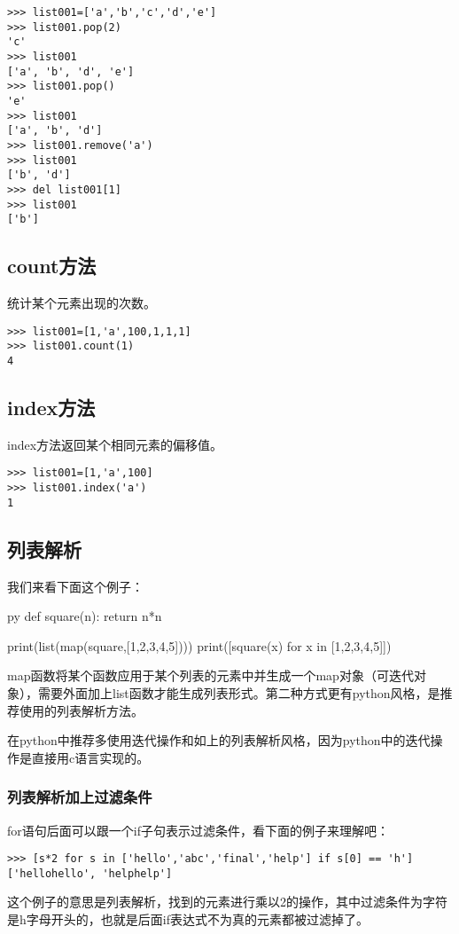 \documentclass[12pt,oneside]{book}
\begin{document}
\begin{common-format}
\begin{Verbatim}
>>> list001=['a','b','c','d','e']
>>> list001.pop(2)
'c'
>>> list001
['a', 'b', 'd', 'e']
>>> list001.pop()
'e'
>>> list001
['a', 'b', 'd']
>>> list001.remove('a')
>>> list001
['b', 'd']
>>> del list001[1]
>>> list001
['b']
\end{Verbatim}


\subsection{count方法}
统计某个元素出现的次数。
\begin{Verbatim}
>>> list001=[1,'a',100,1,1,1]
>>> list001.count(1)
4
\end{Verbatim}


\subsection{index方法}
index方法返回某个相同元素的偏移值。
\begin{Verbatim}
>>> list001=[1,'a',100]
>>> list001.index('a')
1
\end{Verbatim}


\subsection{列表解析}
\label{sec:列表解析}
我们来看下面这个例子：
\begin{xverbatim}[129]{py}
def square(n):
    return n*n
    
print(list(map(square,[1,2,3,4,5])))
print([square(x) for x in [1,2,3,4,5]])
\end{xverbatim}
map函数将某个函数应用于某个列表的元素中并生成一个map对象（可迭代对象），需要外面加上list函数才能生成列表形式。第二种方式更有python风格，是推荐使用的列表解析方法。

在python中推荐多使用迭代操作和如上的列表解析风格，因为python中的迭代操作是直接用c语言实现的。

\subsubsection{列表解析加上过滤条件}
for语句后面可以跟一个if子句表示过滤条件，看下面的例子来理解吧：
\begin{Verbatim}
>>> [s*2 for s in ['hello','abc','final','help'] if s[0] == 'h']
['hellohello', 'helphelp']
\end{Verbatim}

这个例子的意思是列表解析，找到的元素进行乘以2的操作，其中过滤条件为字符是h字母开头的，也就是后面if表达式不为真的元素都被过滤掉了。



\end{common-format}
\end{document}
